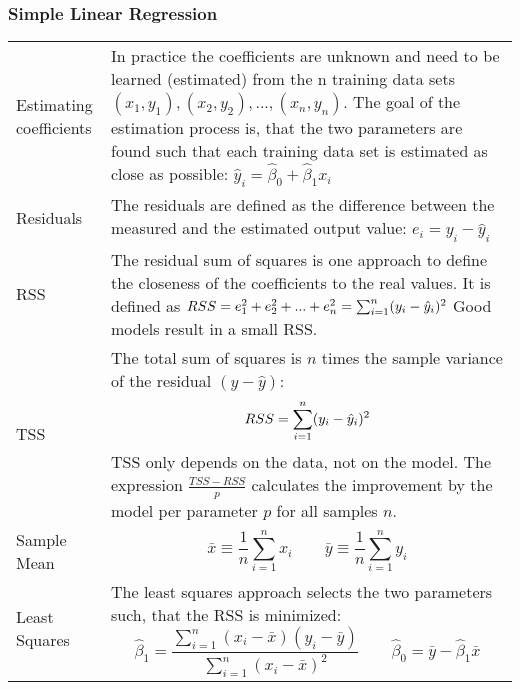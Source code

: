 \subsubsection{Simple Linear Regression}
\begin{onehalfspace}
	\begin{tabularx}{\textwidth}{p{3cm}X}
		Estimating coefficients & In practice the coefficients are unknown and need to be learned (estimated) from the n
		training data sets \( (x_1,y_1), (x_2,y_2),..., (x_n,y_n) \). The goal of the estimation process is, that the two
		parameters are found such that each training data set is estimated as close as possible:
		\( \hat{y}_i = \hat{\beta}_0+\hat{\beta}_1 x_i \) \\
		Residuals & The residuals are defined as the difference between the measured and the estimated output value: 
		\( e_i = y_i-\hat{y}_i \) \\
		RSS & The residual sum of squares is one approach to define the closeness of the coefficients to the real values. It
		is defined as \( RSS = e^2_1+e^2_2+...+e^2_n = \sum_{i=1}^{n} (y_i-\hat{y}_i)^2\) 
		Good models result in a small RSS. \\
		TSS & The total sum of squares is $n$ times the sample variance of the residual $(y-\hat{y})$:
		\[ RSS=\sum_{i=1}^{n} (y_i-\hat{y}_i)^2 \] TSS only depends on the data, not on the model. 
		The expression $\frac{TSS-RSS}{p}$ calculates the improvement by the model per parameter $p$ for all samples $n$. \\
		Sample Mean & \[ \bar{x} \equiv{} \frac{1}{n} \sum_{i=1}^{n} x_i  \qquad
		\bar{y} \equiv{} \frac{1}{n} \sum_{i=1}^{n} y_i \] \\
		Least Squares & The least squares approach selects the two parameters such, that the RSS is minimized:
		\[ \hat{\beta}_1 = \frac{\sum_{i=1}^{n} (x_i-\bar{x})(y_i-\bar{y})}{\sum_{i=1}^{n} (x_i-\bar{x})^2}  \qquad 
		\hat{\beta}_0 = \bar{y}-\hat{\beta}_1 \bar{x} \] \\
	\end{tabularx}
\end{onehalfspace}

